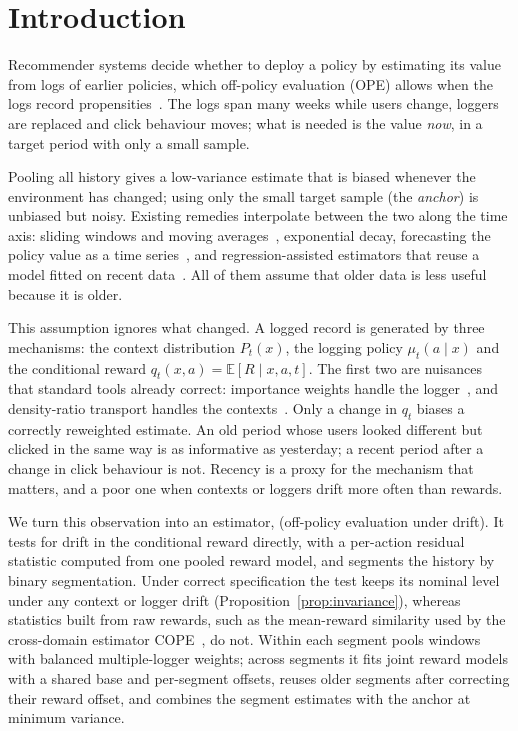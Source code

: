 \section{Introduction}\label{sec:intro}

Recommender systems decide whether to deploy a policy by estimating its value from logs of
earlier policies, which off-policy evaluation (OPE) allows when the logs record
propensities~\cite{horvitz1952generalization,dudik2011doubly}. The logs span many weeks while
users change, loggers are replaced and click behaviour moves; what is needed is the value
\emph{now}, in a target period with only a small sample.

Pooling all history gives a low-variance estimate that is biased whenever the environment
has changed; using only the small target sample (the \emph{anchor}) is unbiased but noisy. Existing remedies interpolate
between the two along the time axis: sliding windows and moving averages~\cite{jagerman2019when},
exponential decay, forecasting the policy value as a time series~\cite{thomas2017predictive,chandak2020towards},
and regression-assisted estimators that reuse a model fitted on recent data~\cite{liu2023asymptotically}.
All of them assume that older data is less useful because it is older.

This assumption ignores what changed. A logged record is generated by three
mechanisms: the context distribution $P_t(x)$, the logging policy $\mu_t(a\mid x)$
and the conditional reward $q_t(x,a)=\mathbb{E}[R\mid x,a,t]$. The first two are
nuisances that standard tools already correct: importance weights handle the logger~\cite{agarwal2017effective},
and density-ratio transport handles the contexts~\cite{uehara2020offpolicy}.
Only a change in $q_t$ biases a correctly reweighted estimate. An old period whose users
looked different but clicked in the same way is as informative as yesterday; a recent
period after a change in click behaviour is not. Recency is a proxy for the mechanism
that matters, and a poor one when contexts or loggers drift more often than rewards.

We turn this observation into an estimator, \odrift{} (off-policy evaluation under drift). It tests for drift in the
conditional reward directly, with a per-action residual statistic computed from one
pooled reward model, and segments the history by binary segmentation. Under correct
specification the test keeps its nominal level under any context or logger drift
(Proposition~\ref{prop:invariance}), whereas statistics built from raw rewards, such
as the mean-reward similarity used by the cross-domain estimator COPE~\cite{natsubori2025cross},
do not. Within each segment \odrift{} pools windows with balanced multiple-logger weights;
across segments it fits joint reward models with a shared base and per-segment offsets,
reuses older segments after correcting their reward offset, and combines the segment
estimates with the anchor at minimum variance.

